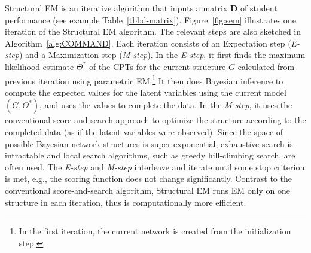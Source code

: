 \documentclass{edm_template}
\begin{document}
Structural EM is an iterative algorithm that  inputs a matrix $\mathbf{D}$ of student performance (see example Table~\ref{tbl:d-matrix}). %
Figure~\ref{fig:sem} illustrates one iteration of the Structural EM algorithm. The relevant steps are also sketched in Algorithm~\ref{alg:COMMAND}. 
Each iteration consists of an Expectation step (\emph{E-step}) and a Maximization step (\emph{M-step}). 
In the \emph{E-step}, it first finds the maximum likelihood estimate $\Theta^*$ of the CPTs 
for the current structure $G$ calculated from previous iteration using parametric EM.\footnote{In the first iteration, the current network is created from the initialization step.}
It then does Bayesian inference to compute the expected values for the latent variables using the current model $(G,\Theta^*)$, 
and uses the values to complete the data.
In the \emph{M-step}, it uses the conventional score-and-search approach to optimize the structure according to the completed data (as if the latent variables were observed).
Since the space of possible Bayesian network structures is super-exponential, 
exhaustive search is intractable and local search algorithms, such as greedy hill-climbing search, are often used.
The \emph{E-step} and \emph{M-step} interleave and iterate until some stop criterion is met, e.g., the scoring function does not change significantly.
Contrast to the conventional score-and-search algorithm, Structural EM runs EM only on one structure in each iteration, thus is computationally more efficient.
\end{document}
